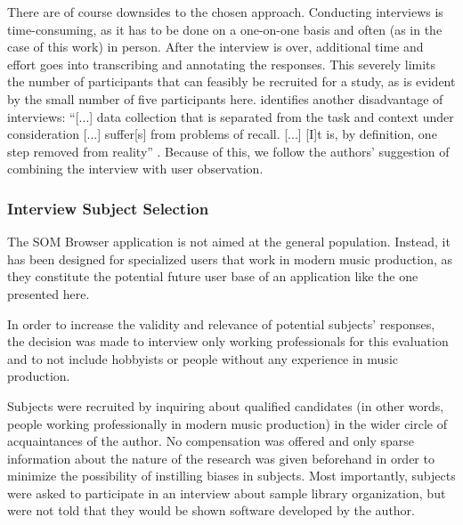 \smallskip

There are of course downsides to the chosen approach. Conducting
interviews is time-consuming, as it has to be done on a one-on-one basis and
often (as in the case of this work) in person. After the interview is over,
additional time and effort goes into transcribing and annotating the responses.
This severely limits the number of participants that can feasibly be recruited
for a study, as is evident by the small number of five participants here.
\citet{lazar2017} identifies another disadvantage of interviews: ``[...] data
collection that is separated from the task and context under consideration [...]
suffer[s] from problems of recall. [...] [I]t is, by definition, one step
removed from reality'' \citep[p.188ff.]{lazar2017}. Because of this, we follow
the authors' suggestion of combining the interview with user observation.

\subsubsection{Interview Subject Selection}
\label{subsubsec:subject_selection}
The SOM Browser application is not aimed at the general population. Instead, it
has been designed for specialized users that work in modern music production, as
they constitute the potential future user base of an application like the one
presented here.

\smallskip

In order to increase the validity and relevance of potential subjects'
responses, the decision was made to interview only working professionals for
this evaluation and to not include hobbyists or people without any experience in
music production.

\smallskip

Subjects were recruited by inquiring about qualified candidates (in other words,
people working professionally in modern music production) in the wider circle of
acquaintances of the author. No compensation was offered and only sparse
information about the nature of the research was given beforehand in order to
minimize the possibility of instilling biases in subjects. Most importantly,
subjects were asked to participate in an interview about sample library
organization, but were not told that they would be shown software developed by
the author.

